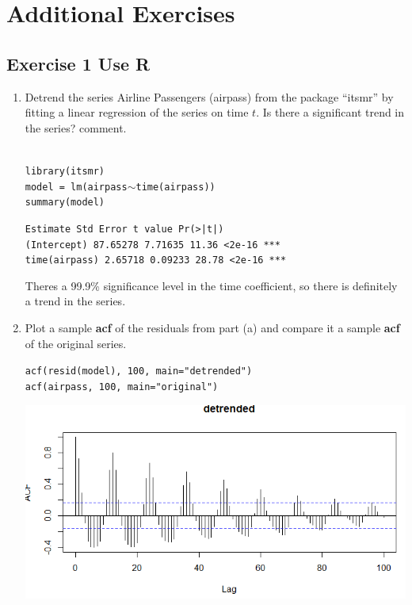 \documentclass[12pt]{article}
\newcommand{\say}[1]{\textquotedblleft{#1}\textquotedblright}
\newcommand{\nl}{\vspace{0.1in}\noindent}
\newcommand{\nnl}{\vspace{0.2in}\noindent}
\begin{document}
\section{Additional Exercises}
\subsection{Exercise 1 Use R}
\begin{enumerate}[label=(\alph*)]
    \item Detrend the series Airline Passengers (airpass) from the package \say{itsmr} by fitting a linear regression of the series on time $t$. Is there a significant trend in the series? comment.
    
    \nl \soln* \\\texttt{library(itsmr)}\\
    \texttt{model = lm(airpass$\sim$time(airpass))}
    \\\texttt{summary(model)}

    \nnl \hspace{.95in}\texttt{Estimate Std Error t value Pr(>|t|)    }\\
    \texttt{(Intercept)   87.65278    7.71635   11.36   <2e-16 ***}\\
    \texttt{time(airpass)  2.65718    0.09233   28.78   <2e-16 ***}
    
    \nl Theres a 99.9\% significance level in the time coefficient, so there is definitely a trend in the series.



    \item Plot a sample \textbf{acf} of the residuals from part (a) and compare it a sample \textbf{acf} of the
    original series.

    \nl \soln*
    \texttt{acf(resid(model), 100, main="detrended")}
    \\\texttt{acf(airpass, 100, main="original")}
    
    \nl \includegraphics[width=5in]{img/detrended.PNG}


\end{enumerate}
\end{document}
